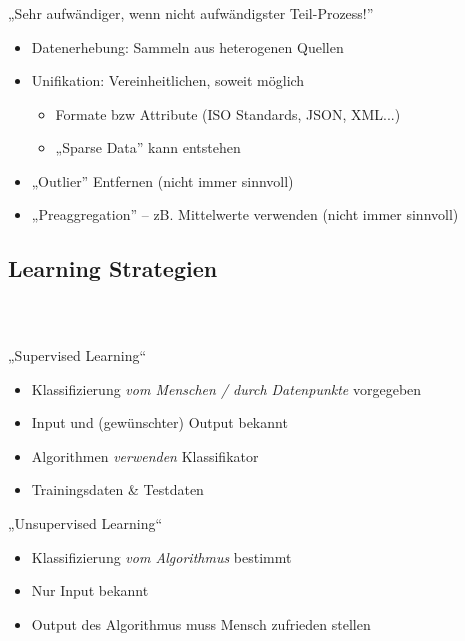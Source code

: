 \begin{frame}
    \frametitle{\insertsubsection}
    „Sehr aufwändiger, wenn nicht aufwändigster Teil-Prozess!” \cite{pocket2014}
    \vspace{1em}
    \begin{itemize}
        \setlength\itemsep{1em}
        \item Datenerhebung: Sammeln aus heterogenen Quellen
        \item Unifikation: Vereinheitlichen, soweit möglich
            \begin{itemize}
                \setlength\itemsep{0.5em}
                \item Formate bzw Attribute (ISO Standards, JSON, XML...)
                \item „Sparse Data” kann entstehen
            \end{itemize}
        \item „Outlier” Entfernen (nicht immer sinnvoll)
        \item „Preaggregation” -- zB. Mittelwerte verwenden (nicht immer sinnvoll)
    \end{itemize}
\end{frame}

\subsection{Learning Strategien}

\begin{frame}
    \frametitle{\insertsubsection \ \cite{datamining2011}}
    \begin{block}{„Supervised Learning“}
        \vspace{0.5em}
        \begin{itemize}
            \setlength\itemsep{0.5em}
            \item Klassifizierung \emph{vom Menschen / durch Datenpunkte} vorgegeben
            \item Input und (gewünschter) Output bekannt
            \item Algorithmen \emph{verwenden} Klassifikator
            \item Trainingsdaten \& Testdaten
        \end{itemize}
    \end{block}
    \vspace{0.8em}
    \begin{block}{„Unsupervised Learning“}
        \vspace{0.5em}
        \begin{itemize}
            \setlength\itemsep{0.5em}
            \item Klassifizierung \emph{vom Algorithmus} bestimmt
            \item Nur Input bekannt
            \item Output des Algorithmus muss Mensch zufrieden stellen
        \end{itemize}
    \end{block}
\end{frame}



